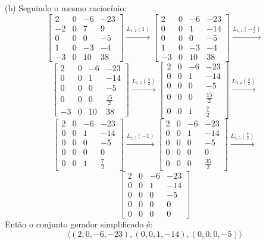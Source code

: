 \documentclass{homework}
\begin{document}
(b) Seguindo o mesmo raciocínio:
\[
\begin{bmatrix}
2 & 0 & -6 & -23\\
-2 & 0 & 7 & 9\\
0 & 0 & 0 & -5\\
1 & 0 & -3 & -4\\
-3 & 0 & 10 & 38
\end{bmatrix} \xrightarrow{L_{1,2}(1)}
\begin{bmatrix}
2 & 0 & -6 & -23\\
0 & 0 & 1 & -14\\
0 & 0 & 0 & -5\\
1 & 0 & -3 & -4\\
-3 & 0 & 10 & 38
\end{bmatrix} \xrightarrow{L_{1,4}(-\frac{1}{2})}
\]
\[
\begin{bmatrix}
2 & 0 & -6 & -23\\
0 & 0 & 1 & -14\\
0 & 0 & 0 & -5\\
0 & 0 & 0 & \frac{15}{2}\\
-3 & 0 & 10 & 38
\end{bmatrix} \xrightarrow{L_{1,5}(\frac{3}{2})}
\begin{bmatrix}
2 & 0 & -6 & -23\\
0 & 0 & 1 & -14\\
0 & 0 & 0 & -5\\
0 & 0 & 0 & \frac{15}{2}\\
0 & 0 & 1 & \frac{7}{2}
\end{bmatrix} \xrightarrow{L_{3,4}(\frac{3}{2})}
\]
\[
\begin{bmatrix}
2 & 0 & -6 & -23\\
0 & 0 & 1 & -14\\
0 & 0 & 0 & -5\\
0 & 0 & 0 & 0\\
0 & 0 & 1 & \frac{7}{2}
\end{bmatrix} \xrightarrow{L_{2,5}(-1)}
\begin{bmatrix}
2 & 0 & -6 & -23\\
0 & 0 & 1 & -14\\
0 & 0 & 0 & -5\\
0 & 0 & 0 & 0\\
0 & 0 & 0 & \frac{35}{2}
\end{bmatrix} \xrightarrow{L_{3,5}(\frac{7}{2})}
\]
\[
\begin{bmatrix}
2 & 0 & -6 & -23\\
0 & 0 & 1 & -14\\
0 & 0 & 0 & -5\\
0 & 0 & 0 & 0\\
0 & 0 & 0 & 0
\end{bmatrix}
\]
Então o conjunto gerador simplificado é:
\[\langle(2,0,-6,-23),(0,0,1,-14),(0,0,0,-5)\rangle\]
\end{document}
